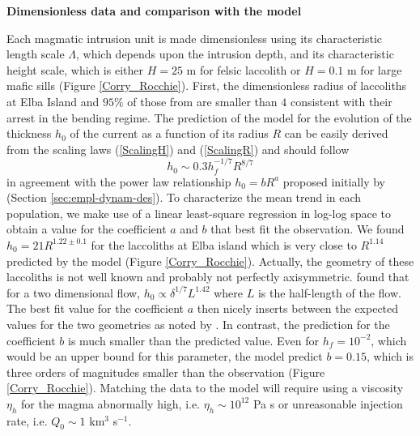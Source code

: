 \vspace{.5cm}  \textbf{Dimensionless  data  and  comparison  with  the
  model} \vspace{.5cm}

Each  magmatic   intrusion  unit  is  made   dimensionless  using  its
characteristic  length   scale  $\Lambda$,  which  depends   upon  the
intrusion depth, and its characteristic  height scale, which is either
$H=25$  m for  felsic laccolith  or $H=0.1$  m for  large mafic  sills
(Figure  \ref{Corry_Rocchie}).   First,  the dimensionless  radius  of
laccoliths at  Elba Island and  $95\%$ of those  from \citet{E:2015tl}
are  smaller than  $4$ consistent  with  their arrest  in the  bending
regime. The prediction of the model for the evolution of the thickness
$h_0$ of  the current as  a function of its  radius $R$ can  be easily
derived from  the scaling  laws (\ref{ScalingH})  and (\ref{ScalingR})
and should follow
\begin{equation}
  h_0 \sim 0.3h_f^{-1/7} R^{8/7}\label{C2-Hr}
\end{equation}
in agreement  with the  power law relationship  $h_0 =  bR^a$ proposed
initially         by         \citet{McCaffrey:1997ea}         (Section
\ref{sec:empl-dynam-des}).   To characterize  the mean  trend in  each
population, we make use of a linear least-square regression in log-log
space to obtain a value for the  coefficient $a$ and $b$ that best fit
the  observation.   We  found  $h_0  = 21  R^{1.22\pm  0.1}$  for  the
laccoliths at Elba island which  is very close to $R^{1.14}$ predicted
by the model (Figure  \ref{Corry_Rocchie}).  Actually, the geometry of
these  laccoliths  is  not  well  known  and  probably  not  perfectly
axisymmetric.   \citet{Anonymous:QWXp_4JV}   found  that  for   a  two
dimensional flow,  $h_0\propto \delta^{1/7}L^{1.42}$ where $L$  is the
half-length of the  flow.  The best fit value for  the coefficient $a$
then nicely inserts between the expected values for the two geometries
as noted  by \citet{Michaut:2011kg}.  In contrast,  the prediction for
the coefficient  $b$ is much  smaller than the predicted  value.  Even
for $h_f=10^{-2}$, which  would be an upper bound  for this parameter,
the  model  predict $b=0.15$,  which  is  three orders  of  magnitudes
smaller than  the observation (Figure  \ref{Corry_Rocchie}).  Matching
the data to the model will  require using a viscosity $\eta_h$ for the
magma  abnormally   high,  i.e.   $\eta_h   \sim  10^{12}$  Pa   s  or
unreasonable injection rate, i.e. $Q_0\sim 1$ km$^3$ s$^{-1}$.

